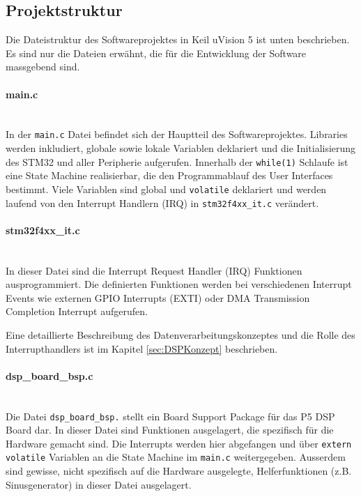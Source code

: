 \subsection{Projektstruktur}
\label{sec:SWProjekt}

Die Dateistruktur des Softwareprojektes in Keil uVision 5 ist unten beschrieben. 
Es sind nur die Dateien erwähnt, die für die Entwicklung der Software massgebend sind.
\\
\paragraph{main.c}\vspace{-0.3cm}\\
In der \texttt{main.c} Datei befindet sich der Hauptteil des Softwareprojektes.
Libraries werden inkludiert, globale sowie lokale Variablen deklariert und die Initialisierung des STM32 und aller Peripherie aufgerufen.
Innerhalb der \texttt{while(1)} Schlaufe ist eine State Machine realisierbar, die den Programmablauf des User Interfaces bestimmt.
Viele Variablen sind global und \texttt{volatile} deklariert und werden laufend von den Interrupt Handlern (IRQ) in \texttt{stm32f4xx\_it.c} verändert.
\\
\paragraph{stm32f4xx\_it.c}\vspace{-0.3cm}\\
In dieser Datei sind die Interrupt Request Handler (IRQ) Funktionen ausprogrammiert.
Die definierten Funktionen werden bei verschiedenen Interrupt Events wie externen GPIO Interrupts (EXTI) oder DMA Transmission Completion Interrupt aufgerufen.

Eine detaillierte Beschreibung des Datenverarbeitungskonzeptes und die Rolle des Interrupthandlers ist im Kapitel \ref{sec:DSPKonzept} beschrieben.
\\
\paragraph{dsp\_board\_bsp.c}\vspace{-0.3cm}\\
Die Datei \texttt{dsp\_board\_bsp.} stellt ein Board Support Package für das P5 DSP Board dar.
In dieser Datei sind Funktionen ausgelagert, die spezifisch für die Hardware gemacht sind.
Die Interrupts werden hier abgefangen und über \texttt{extern volatile} Variablen an die State Machine im \texttt{main.c} weitergegeben.
Ausserdem sind gewisse, nicht spezifisch auf die Hardware ausgelegte, Helferfunktionen (z.B. Sinusgenerator) in dieser Datei ausgelagert.

